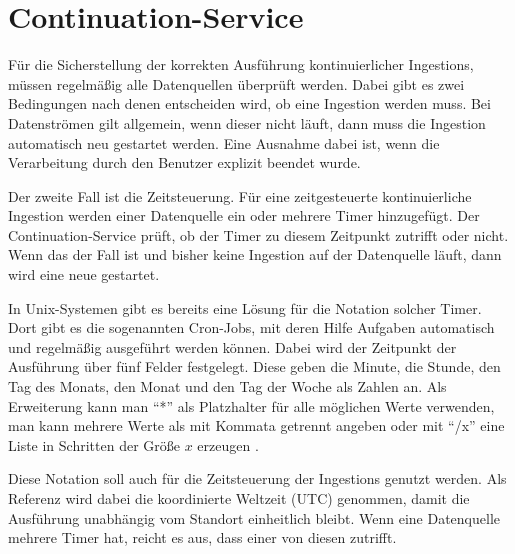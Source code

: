 \section{Continuation-Service}

Für die Sicherstellung der korrekten Ausführung kontinuierlicher Ingestions, müssen regelmäßig alle Datenquellen überprüft werden.
Dabei gibt es zwei Bedingungen nach denen entscheiden wird, ob eine Ingestion werden muss.
Bei Datenströmen gilt allgemein, wenn dieser nicht läuft, dann muss die Ingestion automatisch neu gestartet werden.
Eine Ausnahme dabei ist, wenn die Verarbeitung durch den Benutzer explizit beendet wurde.

Der zweite Fall ist die Zeitsteuerung.
Für eine zeitgesteuerte kontinuierliche Ingestion werden einer Datenquelle ein oder mehrere Timer hinzugefügt.
Der Continuation-Service prüft, ob der Timer zu diesem Zeitpunkt zutrifft oder nicht.
Wenn das der Fall ist und bisher keine Ingestion auf der Datenquelle läuft, dann wird eine neue gestartet.

In Unix-Systemen gibt es bereits eine Lösung für die Notation solcher Timer.
Dort gibt es die sogenannten Cron-Jobs, mit deren Hilfe Aufgaben automatisch und regelmäßig ausgeführt werden können.
Dabei wird der Zeitpunkt der Ausführung über fünf Felder festgelegt.
Diese geben die Minute, die Stunde, den Tag des Monats, den Monat und den Tag der Woche als Zahlen an.
Als Erweiterung kann man "`*"' als Platzhalter für alle möglichen Werte verwenden, man kann mehrere Werte als mit Kommata getrennt angeben oder mit "`/x"' eine Liste in Schritten der Größe $x$ erzeugen \parencite{cron}.

Diese Notation soll auch für die Zeitsteuerung der Ingestions genutzt werden.
Als Referenz wird dabei die koordinierte Weltzeit (UTC) genommen, damit die Ausführung unabhängig vom Standort einheitlich bleibt.
Wenn eine Datenquelle mehrere Timer hat, reicht es aus, dass einer von diesen zutrifft.